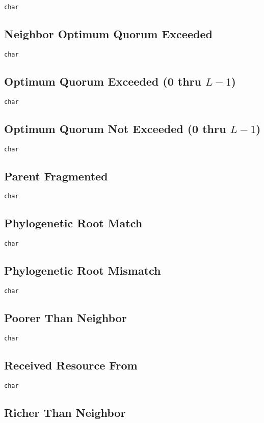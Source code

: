 \texttt{char}

\subsection{Neighbor Optimum Quorum Exceeded}

\texttt{char}

\subsection{Optimum Quorum Exceeded (0 thru $L-1$)}

\texttt{char}

\subsection{Optimum Quorum Not Exceeded (0 thru $L-1$)}

\texttt{char}

\subsection{Parent Fragmented}

\texttt{char}

\subsection{Phylogenetic Root Match}

\texttt{char}

\subsection{Phylogenetic Root Mismatch}

\texttt{char}

\subsection{Poorer Than Neighbor}

\texttt{char}

\subsection{Received Resource From}

\texttt{char}

\subsection{Richer Than Neighbor}


